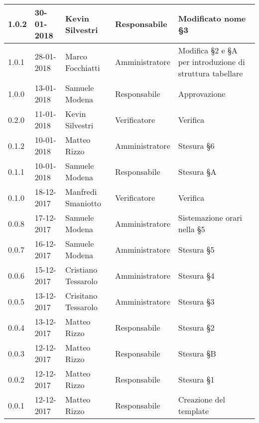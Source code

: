 \documentclass[./PianodiProgetto.tex]{subfiles}
\begin{document}
\begin{longtable}{|p{20mm}|p{20mm}|p{40mm}|p{30mm}|p{50mm}|}
		\hline 1.0.2 & 30-01-2018 & Kevin Silvestri & Responsabile & Modificato nome §3 \\
		
		\hline 1.0.1 & 28-01-2018 & Marco Focchiatti & Amministratore & Modifica §2 e §A per introduzione di struttura tabellare \\
	
		\hline 1.0.0 & 13-01-2018 & Samuele Modena & Responsabile & Approvazione \\
 
		\hline 0.2.0 & 11-01-2018 & Kevin Silvestri & Verificatore & Verifica \\
 
		\hline 0.1.2 & 10-01-2018 & Matteo Rizzo & Amministratore & Stesura §6 \\
 
		\hline 0.1.1 & 10-01-2018 & Samuele Modena & Responsabile & Stesura §A \\
 
		\hline 0.1.0 & 18-12-2017 & Manfredi Smaniotto & Verificatore & Verifica \\
 		
 		\hline 0.0.8 & 17-12-2017 & Samuele Modena & Amministratore & Sistemazione orari nella §5 \\
 		
		\hline 0.0.7 & 16-12-2017 & Samuele Modena & Amministratore & Stesura §5 \\
 
		\hline 0.0.6 & 15-12-2017 & Cristiano Tessarolo & Amministratore & Stesura §4 \\
 
		\hline 0.0.5 & 13-12-2017 & Crisitano Tessarolo & Amministratore & Stesura §3 \\
 
		\hline 0.0.4 & 13-12-2017 & Matteo Rizzo & Responsabile & Stesura §2 \\
 
 		\hline 0.0.3 & 12-12-2017 & Matteo Rizzo & Responsabile & Stesura §B \\
 		
		\hline 0.0.2 & 12-12-2017 & Matteo Rizzo & Responsabile & Stesura §1 \\
 
 		\hline 0.0.1 & 12-12-2017 & Matteo Rizzo & Responsabile & Creazione del template \\
 
		\hline
 
	\end{longtable}
\end{document}

